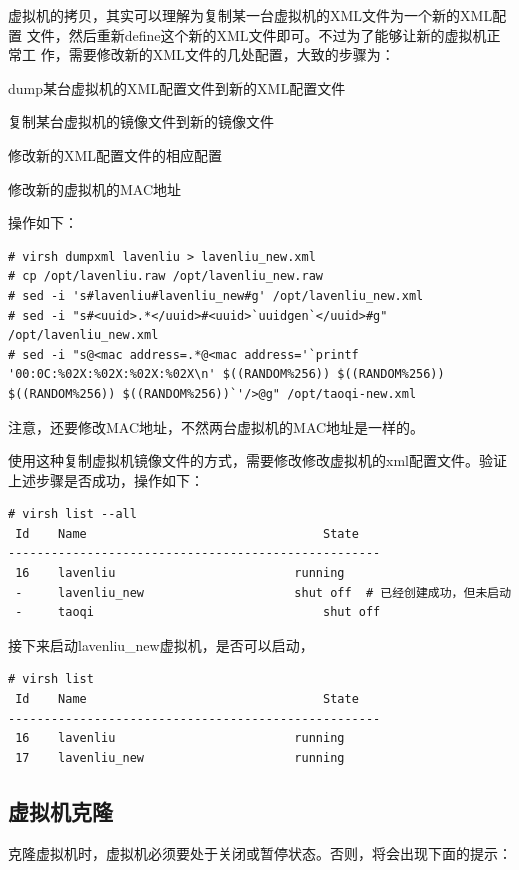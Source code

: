 虚拟机的拷贝，其实可以理解为复制某一台虚拟机的XML文件为一个新的XML配置
文件，然后重新define这个新的XML文件即可。不过为了能够让新的虚拟机正常工
作，需要修改新的XML文件的几处配置，大致的步骤为：

dump某台虚拟机的XML配置文件到新的XML配置文件

复制某台虚拟机的镜像文件到新的镜像文件

修改新的XML配置文件的相应配置

修改新的虚拟机的MAC地址

操作如下：

\begin{verbatim}
# virsh dumpxml lavenliu > lavenliu_new.xml
# cp /opt/lavenliu.raw /opt/lavenliu_new.raw
# sed -i 's#lavenliu#lavenliu_new#g' /opt/lavenliu_new.xml
# sed -i "s#<uuid>.*</uuid>#<uuid>`uuidgen`</uuid>#g" /opt/lavenliu_new.xml
# sed -i "s@<mac address=.*@<mac address='`printf '00:0C:%02X:%02X:%02X:%02X\n' $((RANDOM%256)) $((RANDOM%256)) $((RANDOM%256)) $((RANDOM%256))`'/>@g" /opt/taoqi-new.xml
\end{verbatim}

注意，还要修改MAC地址，不然两台虚拟机的MAC地址是一样的。

使用这种复制虚拟机镜像文件的方式，需要修改修改虚拟机的xml配置文件。验证上述步骤是否成功，操作如下：

\begin{verbatim}
# virsh list --all
 Id    Name                           		State
----------------------------------------------------
 16    lavenliu                       	running
 -     lavenliu_new                   	shut off  # 已经创建成功，但未启动
 -     taoqi                          		shut off
\end{verbatim}

接下来启动lavenliu\_new虚拟机，是否可以启动，

\begin{verbatim}
# virsh list 
 Id    Name                           		State
----------------------------------------------------
 16    lavenliu                       	running
 17    lavenliu_new                   	running
\end{verbatim}

\subsection{虚拟机克隆}
\label{sec:cloneVM}

克隆虚拟机时，虚拟机必须要处于关闭或暂停状态。否则，将会出现下面的提示：

